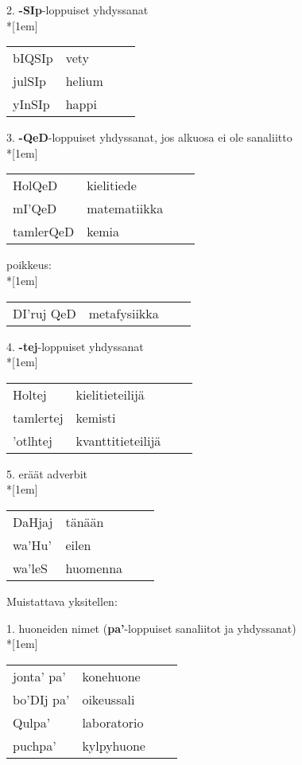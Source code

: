 \documentclass{book}
\begin{document}
2. \textbf{-SIp}-loppuiset yhdyssanat\\*[1em]
\begin{tabular}{Bl Il}
    bIQSIp & vety \\
    julSIp & helium \\
    yInSIp & happi \\
\end{tabular}

3. \textbf{-QeD}-loppuiset yhdyssanat, jos alkuosa ei ole sanaliitto\\*[1em]
\begin{tabular}{Bl Il}
    HolQeD & kielitiede \\
    mI'QeD & matematiikka \\
    tamlerQeD & kemia \\
\end{tabular}

poikkeus:\\*[1em]
\begin{tabular}{Bl Il}
    DI'ruj QeD & metafysiikka \\
\end{tabular}

4. \textbf{-tej}-loppuiset yhdyssanat\\*[1em]
\begin{tabular}{Bl Il}
    Holtej & kielitieteilijä \\
    tamlertej & kemisti \\
    'otlhtej & kvanttitieteilijä \\
\end{tabular}

5. eräät adverbit\\*[1em]
\begin{tabular}{Bl Il}
    DaHjaj  & tänään \\
    wa'Hu' & eilen \\
    wa'leS & huomenna \\
\end{tabular}

Muistattava yksitellen:

1. huoneiden nimet (\textbf{pa'}-loppuiset sanaliitot ja yhdyssanat)\\*[1em]
\begin{tabular}{Bl Il}
    jonta' pa' & konehuone \\
    bo'DIj pa' & oikeussali \\
    Qulpa' & laboratorio \\
    puchpa' & kylpyhuone \\
\end{tabular}
\end{document}

